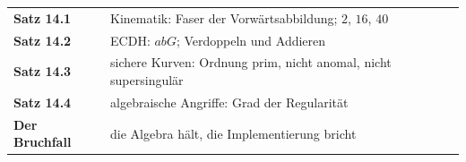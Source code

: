 \begin{merksatz}
\begin{center}
\renewcommand{\arraystretch}{1.5}
\begin{tabular}{@{}P{3.0cm}P{5.6cm}@{}}
\toprule
\textbf{Satz 14.1} & Kinematik: Faser der Vorwärtsabbildung; $2$, $16$, $40$\\
\textbf{Satz 14.2} & ECDH: $abG$; Verdoppeln und Addieren\\
\textbf{Satz 14.3} & sichere Kurven: Ordnung prim, nicht anomal, nicht supersingulär\\
\textbf{Satz 14.4} & algebraische Angriffe: Grad der Regularität\\
\textbf{Der Bruchfall} & die Algebra hält, die Implementierung bricht\\
\bottomrule
\end{tabular}
\end{center}

\begin{center}
\begin{minipage}{0.88\textwidth}
\end{minipage}
\end{center}
\end{merksatz}
